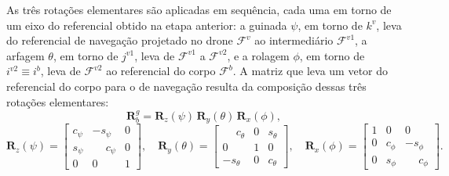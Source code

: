 As três rotações elementares são aplicadas em sequência, cada uma em torno de um eixo do referencial obtido na etapa anterior: a guinada $\psi$, em torno de $k^v$, leva do referencial de navegação projetado no drone $\mathcal{F}^{v}$ ao intermediário $\mathcal{F}^{v1}$, a arfagem $\theta$, em torno de $j^{v1}$, leva de $\mathcal{F}^{v1}$ a $\mathcal{F}^{v2}$, e a rolagem $\phi$, em torno de $i^{v2} \equiv i^{b}$, leva de $\mathcal{F}^{v2}$ ao referencial do corpo $\mathcal{F}^{b}$. A matriz que leva um vetor do referencial do corpo para o de navegação resulta da composição dessas três rotações elementares:
\begin{equation}
  \mathbf{R}^{g}_{b} = \mathbf{R}_z(\psi)\,\mathbf{R}_y(\theta)\,\mathbf{R}_x(\phi),
  \label{eq:R-composicao}
\end{equation}
\begin{equation}
  \mathbf{R}_z(\psi) =
  \begin{bmatrix}
    c_\psi & -s_\psi & 0 \\
    s_\psi & \phantom{-}c_\psi & 0 \\
    0 & 0 & 1
  \end{bmatrix}\!,\quad
  \mathbf{R}_y(\theta) =
  \begin{bmatrix}
    \phantom{-}c_\theta & 0 & s_\theta \\
    0 & 1 & 0 \\
    -s_\theta & 0 & c_\theta
  \end{bmatrix}\!,\quad
  \mathbf{R}_x(\phi) =
  \begin{bmatrix}
    1 & 0 & 0 \\
    0 & c_\phi & -s_\phi \\
    0 & s_\phi & \phantom{-}c_\phi
  \end{bmatrix}\!.
  \label{eq:R-elementares}
\end{equation}


